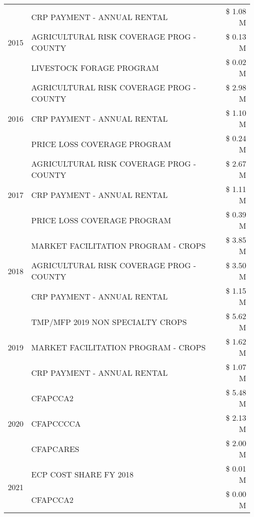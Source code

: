 \begin{tabular}{llr}
\multirow[t]{3}{*}{2015} & CRP PAYMENT - ANNUAL RENTAL & \$ 1.08 M \\
 & AGRICULTURAL RISK COVERAGE PROG - COUNTY & \$ 0.13 M \\
 & LIVESTOCK FORAGE PROGRAM & \$ 0.02 M \\
\cline{1-3}
\multirow[t]{3}{*}{2016} & AGRICULTURAL RISK COVERAGE PROG - COUNTY & \$ 2.98 M \\
 & CRP PAYMENT - ANNUAL RENTAL & \$ 1.10 M \\
 & PRICE LOSS COVERAGE PROGRAM & \$ 0.24 M \\
\cline{1-3}
\multirow[t]{3}{*}{2017} & AGRICULTURAL RISK COVERAGE PROG - COUNTY & \$ 2.67 M \\
 & CRP PAYMENT - ANNUAL RENTAL & \$ 1.11 M \\
 & PRICE LOSS COVERAGE PROGRAM & \$ 0.39 M \\
\cline{1-3}
\multirow[t]{3}{*}{2018} & MARKET FACILITATION PROGRAM - CROPS & \$ 3.85 M \\
 & AGRICULTURAL RISK COVERAGE PROG - COUNTY & \$ 3.50 M \\
 & CRP PAYMENT - ANNUAL RENTAL & \$ 1.15 M \\
\cline{1-3}
\multirow[t]{3}{*}{2019} & TMP/MFP 2019 NON SPECIALTY CROPS & \$ 5.62 M \\
 & MARKET FACILITATION PROGRAM - CROPS & \$ 1.62 M \\
 & CRP PAYMENT - ANNUAL RENTAL & \$ 1.07 M \\
\cline{1-3}
\multirow[t]{3}{*}{2020} & CFAPCCA2 & \$ 5.48 M \\
 & CFAPCCCCA & \$ 2.13 M \\
 & CFAPCARES & \$ 2.00 M \\
\cline{1-3}
\multirow[t]{2}{*}{2021} & ECP COST SHARE FY 2018 & \$ 0.01 M \\
 & CFAPCCA2 & \$ 0.00 M \\
\cline{1-3}
\bottomrule
\end{tabular}
